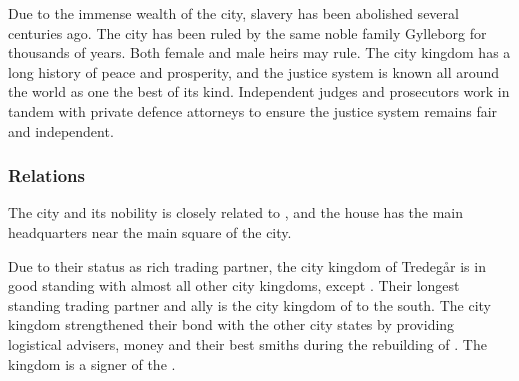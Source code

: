 Due to the immense wealth of the city, slavery has been abolished several
centuries ago. The city has been ruled by the same noble family Gylleborg
for thousands of years. Both female and male heirs may rule. The city kingdom
has a long history of peace and prosperity, and the justice system is known
all around the world as one the best of its kind. Independent judges and
prosecutors work in tandem with private defence attorneys to ensure the
justice system remains fair and independent.

\subsubsection{Relations}

The city and its nobility is closely related to ,
and the house has the main headquarters near the main square of the city.

Due to their status as rich trading partner, the city kingdom of Tredegår is
in good standing with almost all other city kingdoms, except
.  Their longest standing trading partner and ally is the
city kingdom of  to the south. The city kingdom
strengthened their bond with the other city states by providing logistical
advisers, money and their best smiths during the rebuilding of
. The kingdom is a signer of the .
